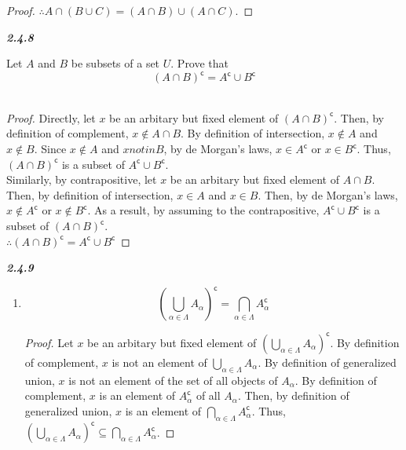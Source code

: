 \documentclass{article}
\begin{document}
\begin{enumerate}
\begin{flushleft}
\begin{proof}
				$\therefore A \cap (B \cup C) = (A \cap B) \cup (A \cap C)$.
			\end{proof}
			
		\end{flushleft}
		\textbf{\textit{2.4.8}}
		\begin{flushleft}
			Let $A$ and $B$ be subsets of a set $U$. Prove that
			\[(A \cap B)^\mathsf{c} = A^\mathsf{c} \cup B^\mathsf{c}\] \\
			\begin{proof}
				Directly, let $x$ be an arbitary but fixed element of $(A \cap B)^\mathsf{c}$. Then, by definition of complement, $x \notin A \cap B$. By definition of intersection, $x \notin A$ and $x \notin B$. Since $x \notin A$ and $x notin B$, by de Morgan's laws, $x \in A^\mathsf{c}$ or $x \in B^\mathsf{c}$. Thus, $(A \cap B)^\mathsf{c}$ is a subset of $A^\mathsf{c} \cup B^\mathsf{c}$.
				\\ \vspace{1mm}
				Similarly, by contrapositive, let $x$ be an arbitary but fixed element of $A \cap B$. Then, by definition of intersection, $x \in A$ and $x \in B$. Then, by de Morgan's laws, $x \notin A^\mathsf{c}$ or $x \notin B^\mathsf{c}$. As a result, by assuming to the contrapositive, $A^\mathsf{c} \cup B^\mathsf{c}$ is a subset of $(A \cap B)^\mathsf{c}$.
				\\ \vspace{1mm}
				$\therefore (A \cap B)^\mathsf{c} = A^\mathsf{c} \cup B^\mathsf{c}$
			\end{proof}
		\end{flushleft}
		\textbf{\textit{2.4.9}}
		\begin{flushleft}
			\begin{enumerate}
				\item \[(\bigcup\limits_{\alpha \in \Lambda} A_\alpha)^\mathsf{c} = \bigcap\limits_{\alpha \in \Lambda} A_\alpha^\mathsf{c}\]
				\begin{proof}
					Let $x$ be an arbitary but fixed element of $(\bigcup\limits_{\alpha \in \Lambda}A_{\alpha})^{\mathsf{c}}$. By definition of complement, $x$ is not an element of $\bigcup\limits_{\alpha \in \Lambda}A_{\alpha}$. By definition of generalized union, $x$ is not an element of the set of all objects of $A_\alpha$. By definition of complement, $x$ is an element of $A_\alpha^\mathsf{c}$ of all $A_\alpha$. Then, by definition of generalized union, $x$ is an element of $\bigcap\limits_{\alpha \in \Lambda} A_\alpha^\mathsf{c}$. Thus, $(\bigcup\limits_{\alpha \in \Lambda} A_\alpha)^\mathsf{c} \subseteq \bigcap\limits_{\alpha \in \Lambda} A_\alpha^\mathsf{c}$.

\end{proof}
\end{enumerate}
\end{flushleft}
\end{enumerate}
\end{document}
